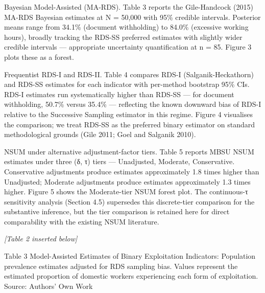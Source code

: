 \documentclass[
  12pt,
  letterpaper,
  DIV=11,
  numbers=noendperiod]{scrartcl}
\begin{document}
Bayesian Model-Assisted (MA-RDS). Table 3 reports the Gile-Handcock
(2015) MA-RDS Bayesian estimates at N = 50,000 with 95\% credible
intervals. Posterior means range from 34.1\% (document withholding) to
84.0\% (excessive working hours), broadly tracking the RDS-SS preferred
estimates with slightly wider credible intervals --- appropriate
uncertainty quantification at n = 85. Figure 3 plots these as a forest.

Frequentist RDS-I and RDS-II. Table 4 compares RDS-I
(Salganik-Heckathorn) and RDS-SS estimates for each indicator with
per-method bootstrap 95\% CIs. RDS-I estimates run systematically higher
than RDS-SS --- for document withholding, 50.7\% versus 35.4\% ---
reflecting the known downward bias of RDS-I relative to the Successive
Sampling estimator in this regime. Figure 4 visualises the comparison;
we treat RDS-SS as the preferred binary estimator on standard
methodological grounds (Gile 2011; Goel and Salganik 2010).

NSUM under alternative adjustment-factor tiers. Table 5 reports MBSU
NSUM estimates under three (δ, τ) tiers --- Unadjusted, Moderate,
Conservative. Conservative adjustments produce estimates approximately
1.8 times higher than Unadjusted; Moderate adjustments produce estimates
approximately 1.3 times higher. Figure 5 shows the Moderate-tier NSUM
forest plot. The continuous-τ sensitivity analysis (Section 4.5)
supersedes this discrete-tier comparison for the substantive inference,
but the tier comparison is retained here for direct comparability with
the existing NSUM literature.

\emph{{[}Table 2 inserted below{]}}

Table 3 Model-Assisted Estimates of Binary Exploitation Indicators:
Population prevalence estimates adjusted for RDS sampling bias. Values
represent the estimated proportion of domestic workers experiencing each
form of exploitation. Source: Authors' Own Work
\end{document}
